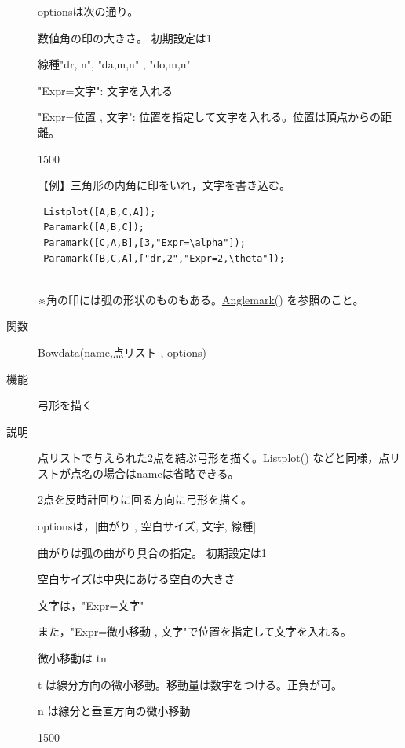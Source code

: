 \documentclass[papersize,a4paper,12pt,uplatex]{jsarticle}
\begin{document}
\begin{description}
optionsは次の通り。

数値角の印の大きさ。 初期設定は1

線種"dr, n", "da,m,n" , "do,m,n"

"Expr=文字": 文字を入れる

"Expr=位置 , 文字": 位置を指定して文字を入れる。位置は頂点からの距離。

\vspace{\baselineskip}
\begin{layer}{150}{0}
\end{layer}

【例】三角形の内角に印をいれ，文字を書き込む。

\begin{verbatim}
 Listplot([A,B,C,A]);
 Paramark([A,B,C]);
 Paramark([C,A,B],[3,"Expr=\alpha"]);
 Paramark([B,C,A],["dr,2","Expr=2,\theta"]);
 
\end{verbatim}

※角の印には弧の形状のものもある。\hyperlink{anglemark}{Anglemark()} を参照のこと。\\

\vspace{\baselineskip}
\hypertarget{bowdata}{}
\item[関数]Bowdata(name,点リスト , options)
\item[機能]弓形を描く
\item[説明]点リストで与えられた2点を結ぶ弓形を描く。Listplot() などと同様，点リストが点名の場合はnameは省略できる。

2点を反時計回りに回る方向に弓形を描く。

optionsは，[曲がり , 空白サイズ, 文字, 線種]

曲がりは弧の曲がり具合の指定。 初期設定は1

空白サイズは中央にあける空白の大きさ

文字は，"Expr=文字" 

また，"Expr=微小移動 , 文字"で位置を指定して文字を入れる。

微小移動は tn 

 t は線分方向の微小移動。移動量は数字をつける。正負が可。

 n は線分と垂直方向の微小移動

\vspace{\baselineskip}
 \begin{layer}{150}{0}
 \end{layer}


\end{description}
\end{document}
